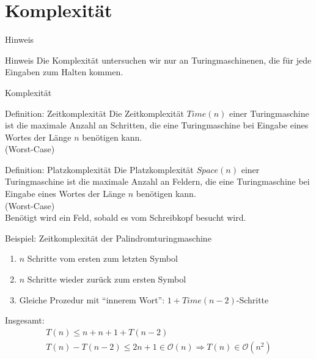 \section{Komplexität}
\begin{frame}{Hinweis}
    \begin{alertblock}{Hinweis}
        Die Komplexität untersuchen wir nur an Turingmaschinenen, die für jede Eingaben zum Halten kommen.
    \end{alertblock}
\end{frame}


\begin{frame}{Komplexität}
    \begin{block}{Definition: Zeitkomplexität}
        Die Zeitkomplexität $Time\left( n \right)$ einer Turingmaschine ist die maximale Anzahl an Schritten, die eine Turingmaschine bei Eingabe eines Wortes der Länge $n$ benötigen kann.\\
        (Worst-Case)
    \end{block}
    \begin{block}{Definition: Platzkomplexität}
        Die Platzkomplexität $Space\left( n \right)$ einer Turingmaschine ist die maximale Anzahl an Feldern, die eine Turingmaschine bei Eingabe eines Wortes der Länge $n$ benötigen kann.\\
        (Worst-Case)\\
        Benötigt wird ein Feld, sobald es vom Schreibkopf besucht wird.
    \end{block}
\end{frame}


\begin{frame}{Beispiel: Zeitkomplexität der Palindromturingmaschine}
    \begin{enumerate}
        \item $n$ Schritte vom ersten zum letzten Symbol
        \item $n$ Schritte wieder zurück zum ersten Symbol
        \item Gleiche Prozedur mit ``innerem Wort'': $1+Time\left( n-2 \right)$-Schritte
    \end{enumerate}
    Insgesamt:
    \begin{align*}
        T\left( n \right) \leq n + n + 1 + T\left( n-2 \right)\\
        T\left( n \right) - T\left( n-2 \right) \leq 2n + 1 \in \mathcal{O}\left( n \right)
        \Rightarrow T\left( n \right) \in \mathcal{O}\left( n^2 \right)
    \end{align*}
\end{frame}


